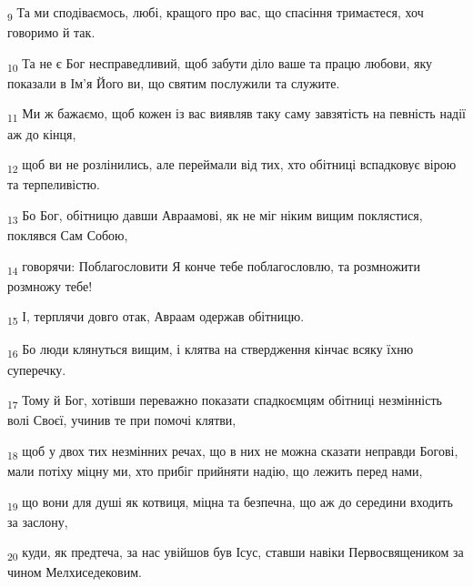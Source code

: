 \begin{tcolorbox}
\textsubscript{9} Та ми сподіваємось, любі, кращого про вас, що спасіння тримаєтеся, хоч говоримо й так.
\end{tcolorbox}
\begin{tcolorbox}
\textsubscript{10} Та не є Бог несправедливий, щоб забути діло ваше та працю любови, яку показали в Ім'я Його ви, що святим послужили та служите.
\end{tcolorbox}
\begin{tcolorbox}
\textsubscript{11} Ми ж бажаємо, щоб кожен із вас виявляв таку саму завзятість на певність надії аж до кінця,
\end{tcolorbox}
\begin{tcolorbox}
\textsubscript{12} щоб ви не розлінились, але переймали від тих, хто обітниці вспадковує вірою та терпеливістю.
\end{tcolorbox}
\begin{tcolorbox}
\textsubscript{13} Бо Бог, обітницю давши Авраамові, як не міг ніким вищим поклястися, поклявся Сам Собою,
\end{tcolorbox}
\begin{tcolorbox}
\textsubscript{14} говорячи: Поблагословити Я конче тебе поблагословлю, та розмножити розмножу тебе!
\end{tcolorbox}
\begin{tcolorbox}
\textsubscript{15} І, терплячи довго отак, Авраам одержав обітницю.
\end{tcolorbox}
\begin{tcolorbox}
\textsubscript{16} Бо люди клянуться вищим, і клятва на ствердження кінчає всяку їхню суперечку.
\end{tcolorbox}
\begin{tcolorbox}
\textsubscript{17} Тому й Бог, хотівши переважно показати спадкоємцям обітниці незмінність волі Своєї, учинив те при помочі клятви,
\end{tcolorbox}
\begin{tcolorbox}
\textsubscript{18} щоб у двох тих незмінних речах, що в них не можна сказати неправди Богові, мали потіху міцну ми, хто прибіг прийняти надію, що лежить перед нами,
\end{tcolorbox}
\begin{tcolorbox}
\textsubscript{19} що вони для душі як котвиця, міцна та безпечна, що аж до середини входить за заслону,
\end{tcolorbox}
\begin{tcolorbox}
\textsubscript{20} куди, як предтеча, за нас увійшов був Ісус, ставши навіки Первосвящеником за чином Мелхиседековим.
\end{tcolorbox}
